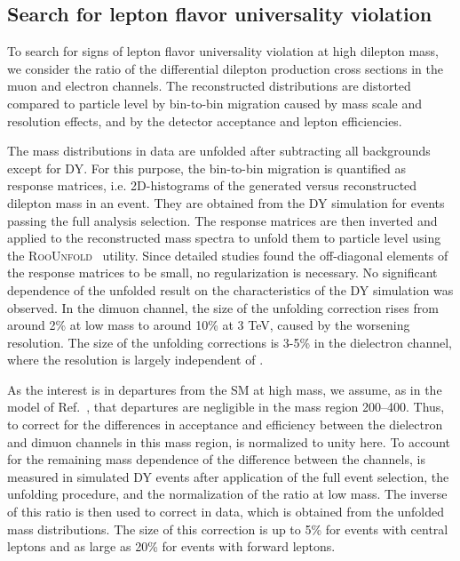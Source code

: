 \documentclass[11pt,twoside,a4paper,cmspaper,final,collab]{cms-tdr}
\begin{document}
\subsection{Search for lepton flavor universality violation}
To search for signs of lepton flavor universality violation at high dilepton mass, we consider the ratio \Rmumuee of the differential dilepton production cross sections in the muon and electron channels. The reconstructed distributions are distorted compared to particle level by bin-to-bin migration caused by mass scale and resolution effects, and by the detector acceptance and lepton efficiencies. 

The mass distributions in data are unfolded after subtracting all backgrounds except for DY. For this purpose, the bin-to-bin migration is quantified as response matrices, i.e. 2D-histograms of the generated versus reconstructed dilepton mass in an event. They are obtained from the DY simulation for events passing the full analysis selection. The response matrices are then inverted and applied to the reconstructed mass spectra to unfold them to particle level using the
 \textsc{RooUnfold}~\cite{Prosper:1306523} utility. Since detailed studies found the off-diagonal elements of the response matrices to be small, no regularization is necessary. No significant dependence of the unfolded result on the characteristics of the DY simulation was observed. In the dimuon channel, the size of the unfolding correction rises from around 2\% at low mass to around 10\% at 3 TeV, caused by the worsening \mll resolution. The size of the unfolding corrections is 3-5\% in the dielectron channel, where the resolution is largely independent of \mll.

As the interest is in departures from the SM at high mass, we assume, as in the model of Ref.~\cite{Greljo:2017vvb}, that departures are negligible in the mass region 200--400\GeV.  Thus, to 
correct for the differences in acceptance and efficiency between the dielectron and dimuon channels in this mass region, \Rmumuee is normalized to unity here. To account for the remaining mass dependence of the difference between the channels, \Rmumuee is measured in simulated DY events after application of the full event selection, the unfolding procedure, and the normalization of the ratio at low mass. The inverse of this ratio is then used to correct \Rmumuee in data, which is obtained from the unfolded mass distributions. The size of this correction is up to 5\% for events with central leptons and as large as 20\% for events with forward leptons.
\end{document}

